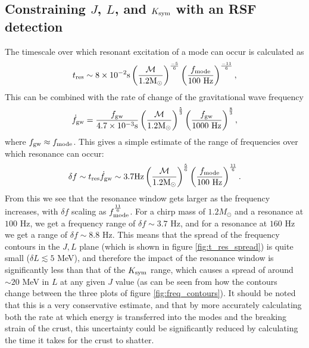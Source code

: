 \documentclass[fleqn,usenatbib]{mnras}
\begin{document}
\subsection{Constraining $J$, $L$, and $K_{\rm sym}$ with an RSF detection}
\hspace{\parindent}The timescale over which resonant excitation of a mode can occur is calculated as \citet{tsang2012resonant}
\begin{align}
t_{\rm res}\sim 8\times10^{-2}\text{s}\left(\frac{\mathcal{M}}{1.2\text{M}_{\odot}}\right)^{\frac{-5}{6}}\left(\frac{f_{\rm mode}}{100 \text{ Hz}}\right)^{\frac{-11}{6}},
\label{res_timescale}    
\end{align}
\noindent This can be combined with the rate of change of the gravitational wave frequency
\begin{align}
\Dot{f}_{\rm gw}=\frac{f_{\rm gw}}{4.7\times10^{-3}\text{s}}\left(\frac{\mathcal{M}}{1.2\text{M}_{\odot}}\right)^{\frac{5}{3}}\left(\frac{f_{\rm gw}}{1000 \text{ Hz}}\right)^{\frac{8}{3}},
\label{res_timescale}    
\end{align}
\noindent where $f_{\rm gw}\approx f_{\rm mode}$. This gives a simple estimate of the range of frequencies over which resonance can occur:
\begin{align}
\delta f\sim t_{\rm res}\Dot{f}_{\rm gw}\sim3.7\text{Hz}\left(\frac{\mathcal{M}}{1.2\text{M}_{\odot}}\right)^{\frac{5}{6}}\left(\frac{f_{\rm mode}}{100 \text{ Hz}}\right)^{\frac{11}{6}}.
\label{res_timescale}    
\end{align}
\noindent From this we see that the resonance window gets larger as the frequency increases, with $\delta f$ scaling as $f_{\rm mode}^{\frac{11}{6}}$. For a chirp mass of $1.2M_{\odot}$ and a resonance at $100$ Hz, we get a frequency range of $\delta f\sim 3.7$ Hz, and for a resonance at $160$ Hz we get a range of $\delta f\sim 8.8$ Hz. This means that the spread of the frequency contours in the $J,L$ plane (which is shown in figure \ref{fig:t_res_spread}) is quite small ($\delta L\lesssim 5$ MeV), and therefore the impact of the resonance window is significantly less than that of the $K_{\rm sym}$ range, which causes a spread of around $\sim 20$ MeV in $L$ at any given $J$ value (as can be seen from how the contours change between the three plots of figure \ref{fig:freq_contours}). It should be noted that this is a very conservative estimate, and that by more accurately calculating both the rate at which energy is transferred into the modes and the breaking strain of the crust, this uncertainty could be significantly reduced by calculating the time it takes for the crust to shatter.
\end{document}
